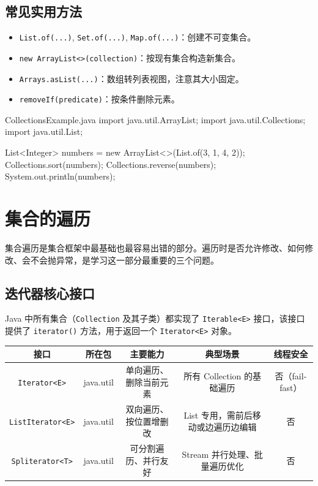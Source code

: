 \subsection{常见实用方法}

\begin{itemize}
    \item \texttt{List.of(...)}, \texttt{Set.of(...)}, \texttt{Map.of(...)}：创建不可变集合。
    \item \texttt{new ArrayList<>(collection)}：按现有集合构造新集合。
    \item \texttt{Arrays.asList(...)}：数组转列表视图，注意其大小固定。
    \item \texttt{removeIf(predicate)}：按条件删除元素。
\end{itemize}

\begin{codeblock}[Java]{CollectionsExample.java}
import java.util.ArrayList;
import java.util.Collections;
import java.util.List;

List<Integer> numbers = new ArrayList<>(List.of(3, 1, 4, 2));
Collections.sort(numbers);
Collections.reverse(numbers);
System.out.println(numbers);
\end{codeblock}

\section{集合的遍历}
集合遍历是集合框架中最基础也最容易出错的部分。遍历时是否允许修改、如何修改、会不会抛异常，是学习这一部分最重要的三个问题。

\subsection{迭代器核心接口}

Java 中所有集合（\texttt{Collection} 及其子类）都实现了 \texttt{Iterable<E>} 接口，该接口提供了 \texttt{iterator()} 方法，用于返回一个 \texttt{Iterator<E>} 对象。

\begin{center}
\begin{tabular}{|c|c|c|c|c|}
\hline
接口 & 所在包 & 主要能力 & 典型场景 & 线程安全 \\
\hline
\texttt{Iterator<E>} & java.util & 单向遍历、删除当前元素 & 所有 Collection 的基础遍历 & 否（fail-fast） \\
\hline
\texttt{ListIterator<E>} & java.util & 双向遍历、按位置增删改 & List 专用，需前后移动或边遍历边编辑 & 否 \\
\hline
\texttt{Spliterator<T>} & java.util & 可分割遍历、并行友好 & Stream 并行处理、批量遍历优化 & 否 \\
\hline
\end{tabular}
\end{center}

